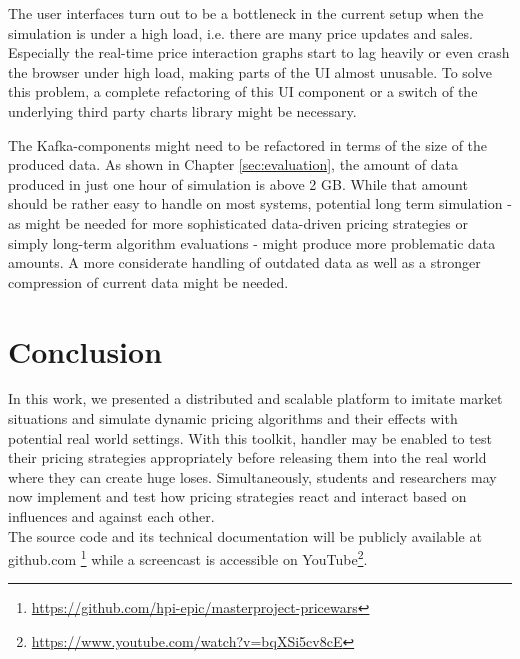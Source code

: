 The user interfaces turn out to be a bottleneck in the current setup when the simulation is under a high load, i.e. there are many price updates and sales. Especially the real-time price interaction graphs start to lag heavily or even crash the browser under high load, making parts of the UI almost unusable. To solve this problem, a complete refactoring of this UI component or a switch of the underlying third party charts library might be necessary.

The Kafka-components might need to be refactored in terms of the size of the produced data. As shown in Chapter \ref{sec:evaluation}, the amount of data produced in just one hour of simulation is above 2 GB. While that amount should be rather easy to handle on most systems, potential long term simulation - as might be needed for more sophisticated data-driven pricing strategies or simply long-term algorithm evaluations - might produce more problematic data amounts. A more considerate handling of outdated data as well as a stronger compression of current data might be needed. 



\section{Conclusion}
\label{sec:conclusion}
%
In this work, we presented a distributed and scalable platform to imitate market situations and simulate dynamic pricing algorithms and their effects with potential real world settings. With this toolkit, handler may be enabled to test their pricing strategies appropriately before releasing them into the real world where they can create huge loses. Simultaneously, students and researchers may now implement and test how pricing strategies react and interact based on influences and against each other.\\

The source code and its technical documentation will be publicly available at github.com \footnote{\url{https://github.com/hpi-epic/masterproject-pricewars}}
while a screencast is accessible on YouTube\footnote{\url{https://www.youtube.com/watch?v=bqXSi5cv8cE}}.\\
